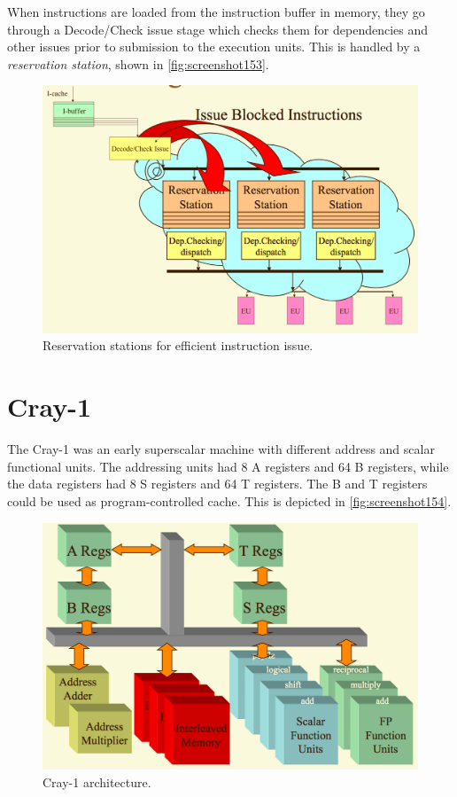 When instructions are loaded from the instruction buffer in memory, they go through a Decode/Check issue stage which checks them for dependencies and other issues prior to submission to the execution units. This is handled by a \textit{reservation station}, shown in \autoref{fig:screenshot153}.

\begin{figure}
\centering
\includegraphics[width=0.7\linewidth]{figures/screenshot153}
\caption{Reservation stations for efficient instruction issue.}
\label{fig:screenshot153}
\end{figure}

\section{Cray-1}
The Cray-1 was an early superscalar machine with different address and scalar functional units. The addressing units had 8 A registers and 64 B registers, while the data registers had 8 S registers and 64 T registers. The B and T registers could be used as program-controlled cache. This is depicted in \autoref{fig:screenshot154}.

\begin{figure}
\centering
\includegraphics[width=0.7\linewidth]{figures/screenshot154}
\caption{Cray-1 architecture.}
\label{fig:screenshot154}
\end{figure}

